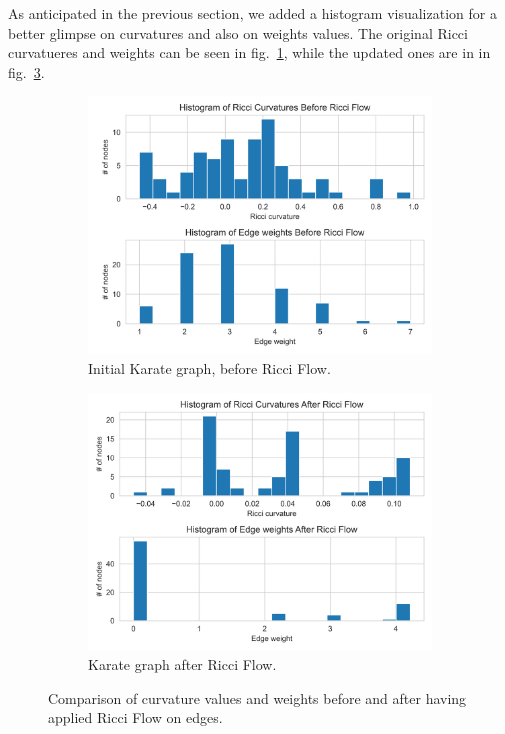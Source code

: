 As anticipated in the previous section, we added a histogram visualization for a better glimpse on curvatures and also on weights values. The original Ricci curvatueres and weights can be seen in fig.~\ref{fig:Karate_comparison_histo_a}, while the updated ones are in in fig.~\ref{fig:Karate_comparison_histo_b}.
\begin{figure}
    \centering
    \begin{subfigure}{0.45\textwidth}
        \centering
        \includegraphics[width=\textwidth]{../KarateClubResults/Before Ricci Flow.png}
        \caption{Initial Karate graph, before Ricci Flow.}
        \label{fig:Karate_comparison_histo_a}
    \end{subfigure}
    \hfill
    \begin{subfigure}{0.45\textwidth}
        \centering
        \includegraphics[width=\textwidth]{../KarateClubResults/After Ricci Flow.png}
        \caption{Karate graph after Ricci Flow.}
        \label{fig:Karate_comparison_histo_b}
    \end{subfigure}
    \caption{Comparison of curvature values and weights before and after having applied Ricci Flow on edges.}
\end{figure}

